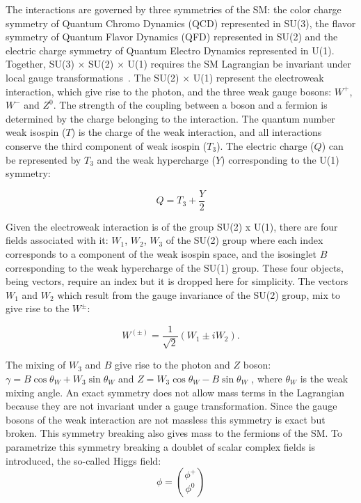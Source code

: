 The interactions are governed by three symmetries of the SM: the color charge 
symmetry of Quantum Chromo Dynamics (QCD) represented in SU(3), the flavor 
symmetry of Quantum Flavor Dynamics (QFD) represented in SU(2) and the electric 
charge symmetry of Quantum Electro Dynamics represented in U(1). Together, SU(3) 
$\times$  SU(2) $\times$ U(1) requires the SM Lagrangian be invariant under 
local gauge transformations~\cite{perkins2000introduction}. The SU(2) $\times$ U(1) represent the electroweak interaction, 
which give rise to the photon, and the three weak gauge bosons: $W^{+}$, $W^{-}$ and $Z^0$.
The strength of the coupling between a boson and a fermion is determined by the 
charge belonging to the interaction. The quantum number weak isospin ($T$) is the charge 
of the weak interaction, and all interactions conserve the third component of weak isospin ($T_{3}$).
The electric charge ($Q$) can be represented by $T_{3}$ and the weak hypercharge ($Y$) 
corresponding to the U(1) symmetry:

\begin{equation}
\label{eq:Q-charge}
Q = T_{3} + \frac{Y}{2}
\end{equation}

Given the electroweak interaction is of the group SU(2) x U(1), there are four fields associated 
with it: $W_{1}$, $W_{2}$, $W_{3}$ of the SU(2) group where each index
corresponds to a component of the weak isospin space, and the isosinglet $B$ corresponding
to the weak hypercharge of the SU(1) group. These four objects, being vectors, require an index but it 
is dropped here for simplicity. The vectors $W_{1}$ and $W_{2}$ which result from the 
gauge invariance of the SU(2) group, mix to give rise to the $W^{\pm}$:

\begin{equation}
\label{eq:vector-boson}
W^{\left(\pm\right)}= \frac{1}{\sqrt{2}}\left(W_{1} \pm iW_{2}\right).
\end{equation}

The mixing of $W_{3}$ and $B$ give rise to the photon and $Z$ boson: 
$\gamma = B \cos \theta_W + W_{3} \sin \theta_W$  and $Z = W_{3}\cos \theta_W - B \sin \theta_W$ ,
where $\theta_W$ is the weak mixing angle. An exact symmetry does not allow mass 
terms in the Lagrangian because they are not invariant under a gauge transformation. 
Since the gauge bosons of the weak interaction are not massless this symmetry is exact 
but broken. This symmetry breaking also gives mass to the fermions of the SM. To 
parametrize this symmetry breaking a doublet of scalar complex fields is introduced, the so-called
Higgs field:
\begin{equation}
\label{eq:higgs-field}
\phi = \binom{\phi^{+}}{\phi^{0}}
\end{equation}

